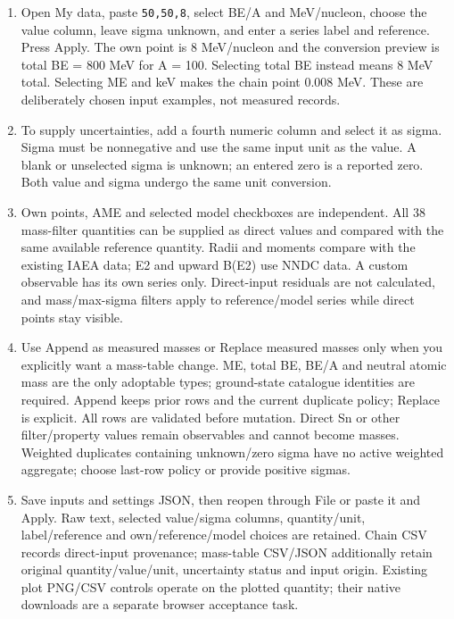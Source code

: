 \documentclass[
  11pt,
  letterpaper,
]{article}
\providecommand{\tightlist}{%
  \setlength{\itemsep}{0pt}\setlength{\parskip}{0pt}}
\begin{document}
\begin{enumerate}
\def\labelenumi{\arabic{enumi}.}
\tightlist
\item
  Open My data, paste \texttt{50,50,8}, select BE/A and MeV/nucleon,
  choose the value column, leave sigma unknown, and enter a series label
  and reference. Press Apply. The own point is 8 MeV/nucleon and the
  conversion preview is total BE = 800 MeV for A = 100. Selecting total
  BE instead means 8 MeV total. Selecting ME and keV makes the chain
  point 0.008 MeV. These are deliberately chosen input examples, not
  measured records.
\item
  To supply uncertainties, add a fourth numeric column and select it as
  sigma. Sigma must be nonnegative and use the same input unit as the
  value. A blank or unselected sigma is unknown; an entered zero is a
  reported zero. Both value and sigma undergo the same unit conversion.
\item
  Own points, AME and selected model checkboxes are independent. All 38
  mass-filter quantities can be supplied as direct values and compared
  with the same available reference quantity. Radii and moments compare
  with the existing IAEA data; E2 and upward B(E2) use NNDC data. A
  custom observable has its own series only. Direct-input residuals are
  not calculated, and mass/max-sigma filters apply to reference/model
  series while direct points stay visible.
\item
  Use Append as measured masses or Replace measured masses only when you
  explicitly want a mass-table change. ME, total BE, BE/A and neutral
  atomic mass are the only adoptable types; ground-state catalogue
  identities are required. Append keeps prior rows and the current
  duplicate policy; Replace is explicit. All rows are validated before
  mutation. Direct Sn or other filter/property values remain observables
  and cannot become masses. Weighted duplicates containing unknown/zero
  sigma have no active weighted aggregate; choose last-row policy or
  provide positive sigmas.
\item
  Save inputs and settings JSON, then reopen through File or paste it
  and Apply. Raw text, selected value/sigma columns, quantity/unit,
  label/reference and own/reference/model choices are retained. Chain
  CSV records direct-input provenance; mass-table CSV/JSON additionally
  retain original quantity/value/unit, uncertainty status and input
  origin. Existing plot PNG/CSV controls operate on the plotted
  quantity; their native downloads are a separate browser acceptance
  task.
\end{enumerate}
\end{document}
